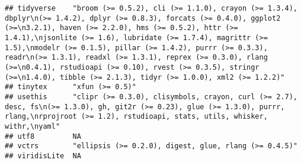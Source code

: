 \documentclass[]{book}
\begin{document}
\begin{verbatim}
## tidyverse    "broom (>= 0.5.2), cli (>= 1.1.0), crayon (>= 1.3.4), dbplyr\n(>= 1.4.2), dplyr (>= 0.8.3), forcats (>= 0.4.0), ggplot2 (>=\n3.2.1), haven (>= 2.2.0), hms (>= 0.5.2), httr (>= 1.4.1),\njsonlite (>= 1.6), lubridate (>= 1.7.4), magrittr (>= 1.5),\nmodelr (>= 0.1.5), pillar (>= 1.4.2), purrr (>= 0.3.3), readr\n(>= 1.3.1), readxl (>= 1.3.1), reprex (>= 0.3.0), rlang (>=\n0.4.1), rstudioapi (>= 0.10), rvest (>= 0.3.5), stringr (>=\n1.4.0), tibble (>= 2.1.3), tidyr (>= 1.0.0), xml2 (>= 1.2.2)"
## tinytex      "xfun (>= 0.5)"                                                                                                                                                                                                                                                                                                                                                                                                                                                                                             
## usethis      "clipr (>= 0.3.0), clisymbols, crayon, curl (>= 2.7), desc, fs\n(>= 1.3.0), gh, git2r (>= 0.23), glue (>= 1.3.0), purrr, rlang,\nrprojroot (>= 1.2), rstudioapi, stats, utils, whisker, withr,\nyaml"                                                                                                                                                                                                                                                                                                       
## utf8         NA                                                                                                                                                                                                                                                                                                                                                                                                                                                                                                          
## vctrs        "ellipsis (>= 0.2.0), digest, glue, rlang (>= 0.4.5)"                                                                                                                                                                                                                                                                                                                                                                                                                                                       
## viridisLite  NA                                                                                                                                                                                                                                                                                                                                                                                                                                                                                                          

\end{verbatim}
\end{document}

